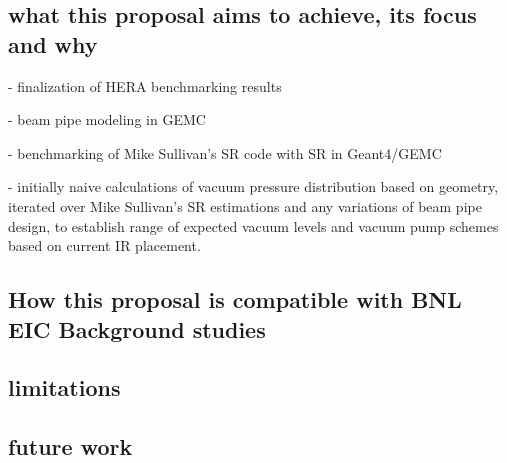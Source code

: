 \subsection{what this proposal aims to achieve, its focus and why}
- finalization of HERA benchmarking results

- beam pipe modeling in GEMC

- benchmarking of Mike Sullivan's SR code with SR in Geant4/GEMC

- initially naive calculations of vacuum pressure distribution based on geometry, iterated over Mike Sullivan's SR estimations and any variations of beam pipe design, to establish range of expected vacuum levels and vacuum pump schemes based on current IR placement.
  
\subsection{How this proposal is compatible with BNL EIC Background studies}

\subsection{limitations}

\subsection{future work}
